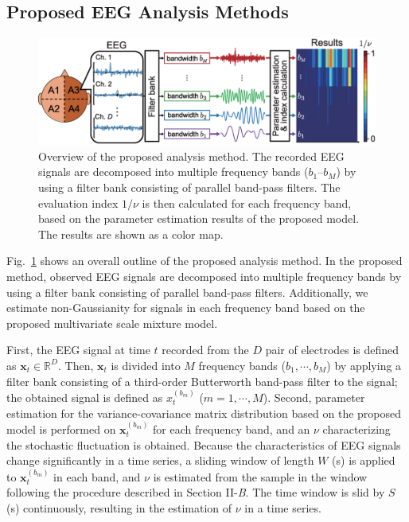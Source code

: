 \documentclass[journal]{IEEEtran}
\begin{document}
\subsection{Proposed EEG Analysis Methods}
\begin{figure}[!ht]
\centering
\includegraphics[width=0.8\hsize]{figure/system_5.eps}
\caption{Overview of the proposed analysis method. The recorded EEG signals are decomposed into multiple frequency bands ($b_1$--$b_M$) by using a filter bank consisting of parallel band-pass filters. 
The evaluation index $1/\nu$ is then calculated for each frequency band, based on the parameter estimation results of the proposed model.
The results are shown as a color map.}
\label{fig:system}
\end{figure}
Fig.~\ref{fig:system} shows an overall outline of the proposed analysis method.
In the proposed method, observed EEG signals are decomposed into multiple frequency bands by using a filter bank consisting of parallel band-pass filters.
Additionally, we estimate non-Gaussianity for signals in each frequency band based on the proposed multivariate scale mixture model.

First, the EEG signal at time $t$ recorded from the $D$ pair of electrodes is defined as $\mathbf{x}_t \in \mathbb{R}^D$. 
Then, $\mathbf{x}_t$ is divided into $M$ frequency bands ($b_1, \cdots, b_M$) by applying a filter bank consisting of a third-order Butterworth band-pass filter to the signal; the obtained signal is defined as $x_t^{(b_m)}$ ($m = 1,\cdots, M$).
Second, parameter estimation for the variance-covariance matrix distribution based on the proposed model is performed on $\mathbf{x}^{(b_m)}_t$ for each frequency band, and an $\nu$ characterizing the stochastic fluctuation is obtained.
Because the characteristics of EEG signals change significantly in a time series, a sliding window of length $W$ (s) is applied to $\mathbf{x}^{(b_m)}_t$ in each band, and $\nu$ is estimated from the sample in the window following the procedure described in Section II-\textit{B}.
The time window is slid by $S$ (s) continuously, resulting in the estimation of $ \nu$ in a time series.
\end{document}
